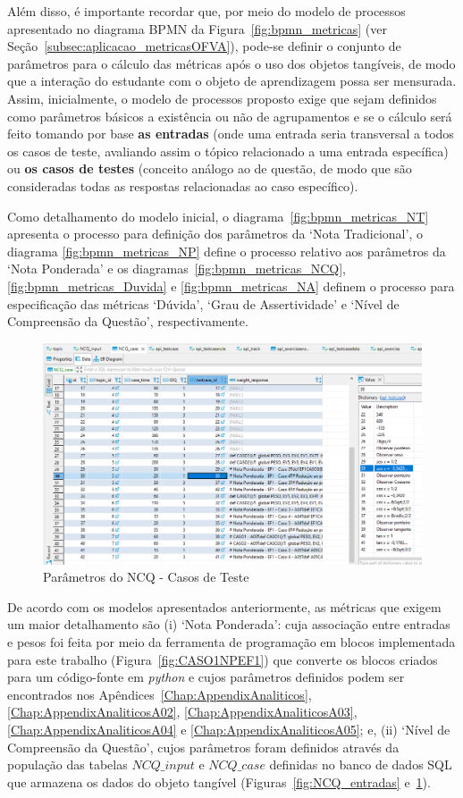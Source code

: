 Além disso, é importante recordar que, por meio do modelo de processos apresentado no diagrama BPMN da Figura~\ref{fig:bpmn_metricas} (ver Seção~\ref{subsec:aplicacao_metricasOFVA}), pode-se definir o conjunto de parâmetros para o cálculo das métricas após o uso dos objetos tangíveis, de modo que a interação do estudante com o objeto de aprendizagem possa ser mensurada. Assim, inicialmente, o modelo de processos proposto exige que sejam definidos como parâmetros básicos a existência ou não de agrupamentos e se o cálculo será feito tomando por base \textbf{as entradas} (onde uma entrada seria transversal a todos os casos de teste, avaliando assim o tópico relacionado a uma entrada específica) ou \textbf{os casos de testes} (conceito análogo ao de questão, de modo que são consideradas todas as respostas relacionadas ao caso específico). 

Como detalhamento do modelo inicial, o diagrama~\ref{fig:bpmn_metricas_NT} apresenta o processo para definição dos parâmetros da `Nota Tradicional', o diagrama \ref{fig:bpmn_metricas_NP} define o processo relativo aos parâmetros da `Nota Ponderada' e os diagramas~\ref{fig:bpmn_metricas_NCQ}, \ref{fig:bpmn_metricas_Duvida} e \ref{fig:bpmn_metricas_NA} definem o processo para especificação das métricas `Dúvida', `Grau de Assertividade' e `Nível de Compreensão da Questão', respectivamente. 

\begin{figure}[htb]
	\centering
	\includegraphics[width=1\linewidth]{chapters/proposedMethod/tools/NCQ_case.png}
	\caption{Parâmetros do NCQ - Casos de Teste}
	\label{fig:NCQ_case}
\end{figure}

De acordo com os modelos apresentados anteriormente, as métricas que exigem um maior detalhamento são (i) `Nota Ponderada': cuja associação entre entradas e pesos foi feita por meio da ferramenta de programação em blocos implementada para este trabalho (Figura~\ref{fig:CASO1NPEF1}) que converte os blocos criados para um código-fonte em \textit{python} e cujos parâmetros definidos podem ser encontrados nos Apêndices~\ref{Chap:AppendixAnaliticos}, \ref{Chap:AppendixAnaliticosA02},  \ref{Chap:AppendixAnaliticosA03},  \ref{Chap:AppendixAnaliticosA04} e  \ref{Chap:AppendixAnaliticosA05}; e, (ii) `Nível de Compreensão da Questão', cujos parâmetros foram definidos através da população das tabelas \textit{$NCQ\_input$} e \textit{$NCQ\_case$} definidas no banco de dados SQL que armazena os dados do objeto tangível (Figuras~\ref{fig:NCQ_entradas} e~\ref{fig:NCQ_case}).

